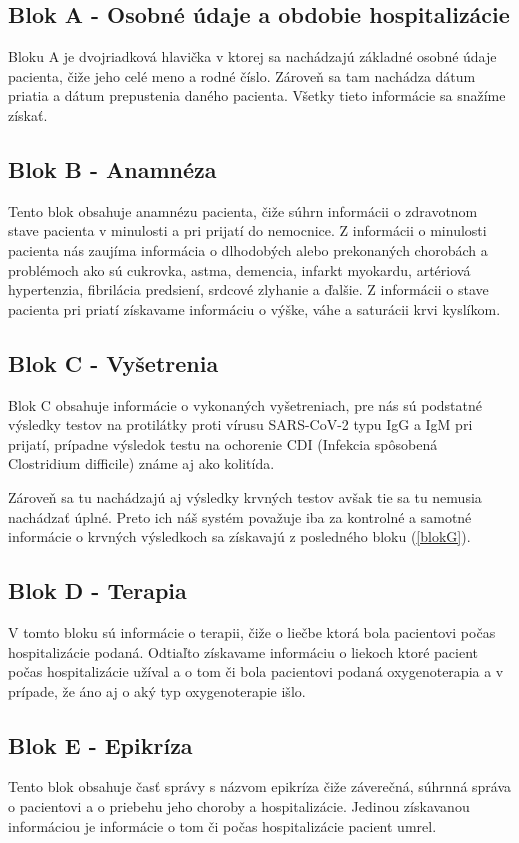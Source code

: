 \subsection{Blok A - Osobné údaje a obdobie hospitalizácie}
\label{blokA}
Bloku A je dvojriadková hlavička v ktorej sa nachádzajú základné osobné údaje pacienta, čiže jeho celé meno a rodné číslo. Zároveň sa tam nachádza dátum priatia a dátum prepustenia daného pacienta. Všetky tieto informácie sa snažíme získať.

\subsection{Blok B - Anamnéza}
\label{blokB}
Tento blok obsahuje anamnézu pacienta, čiže súhrn informácii o zdravotnom stave pacienta v minulosti a pri prijatí do nemocnice. Z informácii o minulosti pacienta nás zaujíma informácia o dlhodobých alebo prekonaných chorobách a problémoch ako sú cukrovka, astma, demencia, infarkt myokardu, artériová hypertenzia, fibrilácia predsiení, srdcové zlyhanie a ďalšie. Z informácii o stave pacienta pri priatí získavame informáciu o výške, váhe a saturácii krvi kyslíkom.

\subsection{Blok C - Vyšetrenia}
\label{blokC}
Blok C obsahuje informácie o vykonaných vyšetreniach, pre nás sú podstatné výsledky testov na protilátky proti vírusu SARS-CoV-2 typu IgG a IgM pri prijatí, prípadne výsledok testu na ochorenie CDI (Infekcia spôsobená Clostridium difficile) známe aj ako kolitída.

Zároveň sa tu nachádzajú aj výsledky krvných testov avšak tie sa tu nemusia nachádzať úplné. Preto ich náš systém považuje iba za kontrolné a samotné informácie o krvných výsledkoch sa získavajú z posledného bloku (\ref{blokG}).

\subsection{Blok D - Terapia}
\label{blokD}
V tomto bloku sú informácie o terapii, čiže o liečbe ktorá bola pacientovi počas hospitalizácie podaná. Odtiaľto získavame informáciu o liekoch ktoré pacient počas hospitalizácie užíval a o tom či bola pacientovi podaná oxygenoterapia a v prípade, že áno aj o aký typ oxygenoterapie išlo.

\subsection{Blok E - Epikríza}
\label{blokE}
Tento blok obsahuje časť správy s názvom epikríza čiže záverečná, súhrnná správa o pacientovi a o priebehu jeho choroby a hospitalizácie. Jedinou získavanou informáciou je informácie o tom či počas hospitalizácie pacient umrel. 

